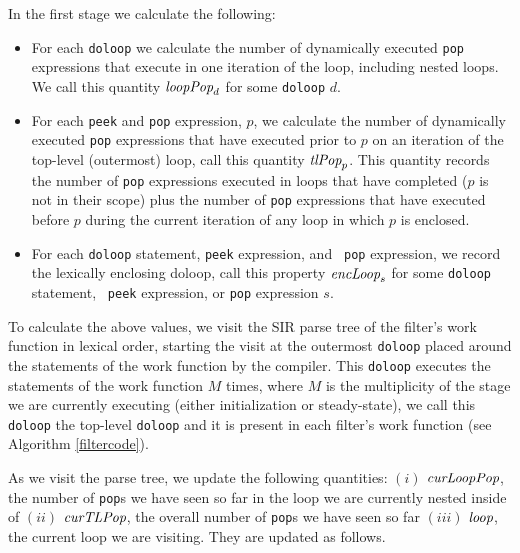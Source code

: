 \documentclass[10pt, letterpaper, onecolumn]{article}
\begin{document}
In the first stage we calculate the following:
\begin{itemize}
\item For each {\tt doloop} we calculate the number of dynamically
  executed {\tt pop} expressions that execute in one iteration of the
  loop, including nested loops.  We call this quantity
  $\mbox{\it loopPop}_d$ for some {\tt doloop} $d$.
\item For each {\tt peek} and {\tt pop} expression, $p$, we calculate
  the number of dynamically executed {\tt pop} expressions that have
  executed prior to $p$ on an iteration of the top-level (outermost)
  loop, call this quantity $\mbox{\it tlPop}_p$.  This quantity records the
  number of {\tt pop} expressions executed in loops that have
  completed ($p$ is not in their scope) plus the number of {\tt pop}
  expressions that have executed before $p$ during the current
  iteration of any loop in which $p$ is enclosed.
\item For each {\tt doloop} statement, {\tt peek} expression, and {\tt
  pop} expression, we record the lexically enclosing doloop, call this
  property $\mbox{\it encLoop}_s$ for some {\tt doloop} statement, {\tt
  peek} expression, or {\tt pop} expression $s$.
\end{itemize}

To calculate the above values, we visit the SIR parse tree of the
filter's work function in lexical order, starting the visit at the
outermost {\tt doloop} placed around the statements of the work
function by the compiler.  This {\tt doloop} executes the statements
of the work function $M$ times, where $M$ is the multiplicity of the
stage we are currently executing (either initialization or
steady-state), we call this {\tt doloop} the top-level {\tt doloop}
and it is present in each filter's work function (see Algorithm
\ref{filtercode}).

As we visit the parse tree, we update the following quantities:
$(i)$ $\mbox{\it curLoopPop}$, the number of {\tt pop}s we have seen so far
in the loop we are currently nested inside of $(ii)$ $\mbox{\it curTLPop}$,
the overall number of {\tt pop}s we have seen so far $(iii)$
$\mbox{\it loop}$, the current loop we are visiting.  They are updated as
follows.
\end{document}
